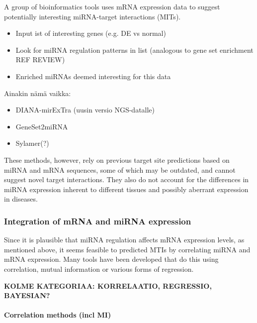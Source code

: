 A group of bioinformatics tools uses mRNA expression data to suggest
potentially interesting miRNA-target interactions (MITs).
\begin{itemize}
  \item
  Input ist of interesting genes (e.g. DE vs normal)
  \item
  Look for miRNA regulation patterns in list (analogous to gene set enrichment REF REVIEW)
  \item
  Enriched miRNAs deemed interesting for this data
\end{itemize}



Ainakin nämä vaikka:
\begin{itemize}
  \item
  DIANA-mirExTra (uusin versio NGS-datalle)
  \item
  GeneSet2miRNA
  \item
  Sylamer(?)
\end{itemize}

These methods, however, rely on previous target site predictions based on
miRNA and mRNA sequences, some of which may be outdated, and 
cannot suggest novel target interactions. They also do not account for
the differences in miRNA expression inherent to different tissues and
possibly aberrant expression in diseases.


\subsubsection{Integration of mRNA and miRNA expression}

Since it is plausible that miRNA regulation affects mRNA expression levels, as
mentioned above, it seems feasible to predicted MTIs by correlating miRNA and
mRNA expression. Many tools have been developed that do this using
correlation, mutual information or various forms of regression.

\textbf{KOLME KATEGORIAA: KORRELAATIO, REGRESSIO, BAYESIAN?}

\paragraph{Correlation methods (incl MI)}\label{correlation-methods}

